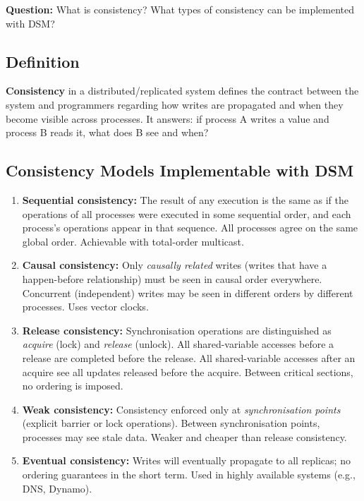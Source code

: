 \documentclass[12pt,a4paper]{article}
\begin{document}
\textbf{Question:} What is consistency? What types of consistency can be implemented with DSM?

\subsection*{Definition}

\textbf{Consistency} in a distributed/replicated system defines the contract between the system and programmers regarding how writes are propagated and when they become visible across processes. It answers: if process A writes a value and process B reads it, what does B see and when?

\subsection*{Consistency Models Implementable with DSM}

\begin{enumerate}
  \item \textbf{Sequential consistency:} The result of any execution is the same as if the operations of all processes were executed in some sequential order, and each process's operations appear in that sequence. All processes agree on the same global order. Achievable with total-order multicast.

  \item \textbf{Causal consistency:} Only \emph{causally related} writes (writes that have a happen-before relationship) must be seen in causal order everywhere. Concurrent (independent) writes may be seen in different orders by different processes. Uses vector clocks.

  \item \textbf{Release consistency:} Synchronisation operations are distinguished as \emph{acquire} (lock) and \emph{release} (unlock). All shared-variable accesses before a release are completed before the release. All shared-variable accesses after an acquire see all updates released before the acquire. Between critical sections, no ordering is imposed.

  \item \textbf{Weak consistency:} Consistency enforced only at \emph{synchronisation points} (explicit barrier or lock operations). Between synchronisation points, processes may see stale data. Weaker and cheaper than release consistency.

  \item \textbf{Eventual consistency:} Writes will eventually propagate to all replicas; no ordering guarantees in the short term. Used in highly available systems (e.g., DNS, Dynamo).
\end{enumerate}
\end{document}
